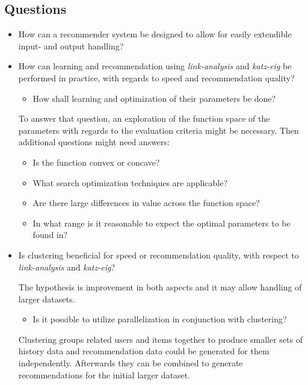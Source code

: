 \documentclass[11pt]{article}
\begin{document}
\newpage


\subsection*{Questions}

\begin{itemize}

    \item How can a recommender system be designed to allow for easily extendible input- and output handling?


    \item How can learning and recommendation using \textit{link-analysis} and \textit{katz-eig} be performed in practice, with regards to speed and recommendation quality?

        \begin{itemize}
            \item How shall learning and optimization of their parameters be done?
        \end{itemize}

        To answer that question, an exploration of the function space of the parameters with regards to the evaluation criteria might be necessary. Then additional questions might need answers:

          \begin{itemize}
                \item Is the function convex or concave?
                \item What search optimization techniques are applicable?
                \item Are there large differences in value across the function space?
                \item In what range is it reasonable to expect the optimal parameters to be found in?
          \end{itemize}


    \item Is clustering beneficial for speed or recommendation quality, with respect to \textit{link-analysis} and \textit{katz-eig}?

          The hypothesis is improvement in both aspects and it may allow handling of larger datasets.

          \begin{itemize}
                \item Is it possible to utilize parallelization in conjunction with clustering?
          \end{itemize}

          Clustering groups related users and items together to produce smaller sets of history data and recommendation data could be generated for them independently. Afterwards they can be combined to generate recommendations for the initial larger dataset.

\end{itemize}
\end{document}
